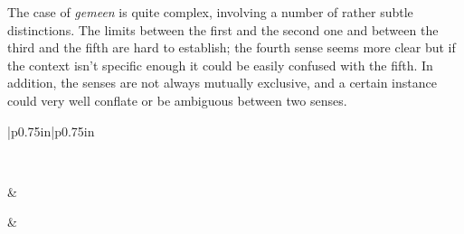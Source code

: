 \documentclass[
]{book}
\begin{document}
The case of \emph{gemeen} is quite complex, involving a number of rather subtle distinctions. The limits between the first and the second one and between the third and the fifth are hard to establish; the fourth sense seems more clear but if the context isn't specific enough it could be easily confused with the fifth. In addition, the senses are not always mutually exclusive, and a certain instance could very well conflate or be ambiguous between two senses.

\providecommand{\docline}[3]{\noalign{\global\setlength{\arrayrulewidth}{#1}}\arrayrulecolor[HTML]{#2}\cline{#3}}

\setlength{\tabcolsep}{2pt}

\renewcommand*{\arraystretch}{1.5}

\begin{longtable}[c]{|p{0.75in}|p{0.75in}}

\caption{Some caption.}\label{tab:simil-adj}\\


 &  \\

\noalign{\global\setlength{\arrayrulewidth}{2pt}}

\endfirsthead


 &  \\


\end{longtable}
\end{document}
